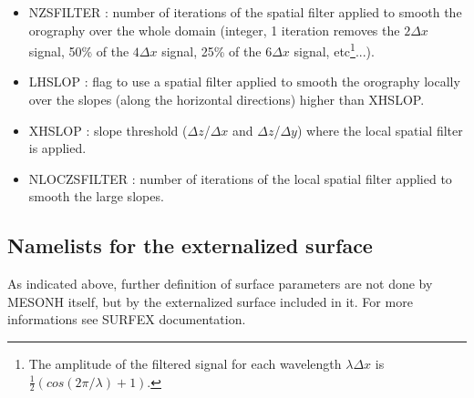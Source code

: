 \begin{itemize}
\item NZSFILTER : number of iterations of the spatial filter applied to smooth the orography over the whole domain (integer, 1 iteration removes the $2\Delta x$ signal, 50\% of the $4\Delta x$
signal, 25\% of the $6\Delta x$ signal, etc\footnote{The amplitude of the
filtered signal for each wavelength $\lambda\Delta x$ 
is $\frac{1}{2}\left( cos(2\pi/\lambda) +1\right)$.}...).
\item LHSLOP : flag to use a spatial filter applied to smooth the orography locally over the slopes (along the horizontal directions) higher than XHSLOP.
\item XHSLOP : slope threshold ($\Delta z$/$\Delta x$ and $\Delta z$/$\Delta y$) where the local spatial filter is applied.
\item NLOCZSFILTER : number of iterations of the local spatial filter applied to smooth the large slopes.

\end{itemize}
\subsection{Namelists for the externalized surface}

As indicated above, further definition of surface parameters are not done by MESONH itself, but by the externalized surface included in it. For more informations see SURFEX documentation.\\

